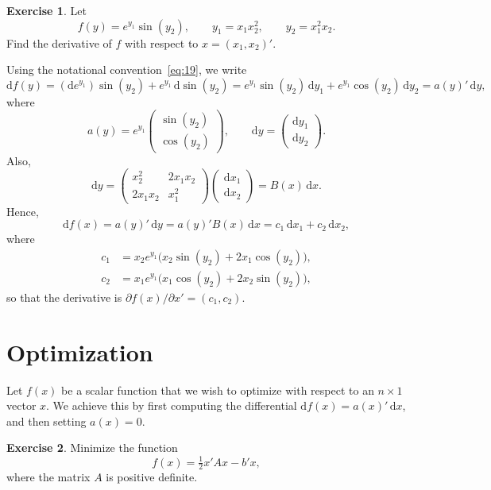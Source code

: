 \documentclass[12pt,a4paper]{article}
\makeatletter
\theoremstyle{definition}
\newtheorem{exercise}{Exercise}
\renewenvironment{proof}[1][\proofname]{\par
  \pushQED{\qed}%
  \normalfont \topsep6\p@\@plus6\p@\relax
  \trivlist
  \item[\hskip\labelsep\bfseries #1\@addpunct{.}]\ignorespaces
}{%
  \popQED\endtrivlist\@endpefalse
}
\newenvironment{solution}{%
  \begin{proof}[Solution]%
}{%
  \end{proof}%
}
\newcommand{\dd}{\mathrm{d}}
\makeatother
\begin{document}
\begin{exercise}\label{exer:13}
Let
\[
f(y) = e^{y_1} \sin(y_2), \qquad y_1 = x_1 x_2^2, \qquad y_2 = x_1^2 x_2.
\]
Find the derivative of $f$ with respect to $x = (x_1, x_2)'$.
\end{exercise}

\begin{solution}
Using the notational convention~\eqref{eq:19}, we write
\[
\dd f(y) = (\dd e^{y_1})\sin(y_2) + e^{y_1}\, \dd\sin(y_2)
= e^{y_1}\sin(y_2)\, \dd y_1 + e^{y_1}\cos(y_2)\, \dd y_2 = a(y)'\, \dd y,
\]
where
\[
a(y) = e^{y_1} \begin{pmatrix} \sin(y_2) \\ \cos(y_2) \end{pmatrix}, \qquad
\dd y = \begin{pmatrix} \dd y_1 \\ \dd y_2 \end{pmatrix}.
\]
Also,
\[
\dd y = \begin{pmatrix} x_2^2 & 2x_1 x_2 \\ 2x_1 x_2 & x_1^2 \end{pmatrix}
\begin{pmatrix} \dd x_1 \\ \dd x_2 \end{pmatrix} = B(x)\, \dd x.
\]
Hence,
\[
\dd f(x) = a(y)'\, \dd y = a(y)' B(x)\, \dd x = c_1\, \dd x_1 + c_2\, \dd x_2,
\]
where
\begin{align*}
c_1 &= x_2 e^{y_1}\bigl(x_2 \sin(y_2) + 2x_1 \cos(y_2)\bigr), \\
c_2 &= x_1 e^{y_1}\bigl(x_1 \cos(y_2) + 2x_2 \sin(y_2)\bigr),
\end{align*}
so that the derivative is $\partial f(x)/\partial x' = (c_1, c_2)$. %
\end{solution}

\section{Optimization}\label{sec:5}

Let $f(x)$ be a scalar function that we wish to optimize with respect to an $n \times 1$ vector $x$. We achieve this by first computing the differential $\dd f(x) = a(x)'\, \dd x$, and then setting $a(x) = 0$. %

\begin{exercise}\label{exer:14}
Minimize the function
\[
f(x) = \tfrac{1}{2} x'Ax - b'x,
\]
where the matrix $A$ is positive definite.
\end{exercise}
\end{document}
